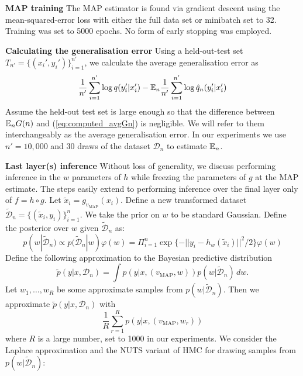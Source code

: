 \documentclass{article} %
\begin{document}

\textbf{MAP training}
The MAP estimator is found via gradient descent using the mean-squared-error loss with either the full data set or minibatch set to 32. Training was set to 5000 epochs. No form of early stopping was employed.

\textbf{Calculating the generalisation error}
Using a held-out-test set $T_{n'} = \{(x_i',y_i')\}_{i=1}^{n'}$, we calculate the average generalisation error as
\begin{equation}
\frac{1}{n'} \sum_{i=1}^{n'} \log q(y_i'|x_i') - {\mathbb{E}}_n \frac{1}{n'} \sum_{i=1}^{n'} \log \hat q_n(y_i'|x_i')
\label{eq:computed_avgGn}
\end{equation}
Assume the held-out test set is large enough so that the difference between ${\mathbb{E}}_n G(n)$ and (\ref{eq:computed_avgGn}) is negligible. We will refer to them interchangeably as the average generalisation error. In our experiments we use $n' = 10,000$ and $30$ draws of the dataset $\mathcal{D}_n$ to estimate ${\mathbb{E}}_n$.

\textbf{Last layer(s) inference}
Without loss of generality, we discuss performing inference in the $w$ parameters of $h$ while freezing the parameters of $g$ at the MAP estimate. The steps easily extend to performing inference over the final layer only of $f = h \circ g$. Let $\tilde x_i = g_{v_{\operatorname{MAP}}}(x_i)$. Define a new transformed dataset $\tilde{\mathcal D}_n = \{(\tilde x_i, y_i) \}_{i=1}^n$. We take the prior on $w$ to be standard Gaussian. 
Define the posterior over $w$ given $\tilde{\mathcal D}_n$ as:
\begin{equation}
p(w | \tilde{\mathcal D}_n) \propto p(\tilde{\mathcal D}_n | w) \varphi(w) = \Pi_{i=1}^n \exp\{-|| y_i - h_w(\tilde x_i) ||^2/2\} \varphi(w)
\label{eq:last_layer_posterior}
\end{equation}
Define the following approximation to the Bayesian predictive distribution
$$
\tilde p(y|x, \mathcal D_n) = \int p(y|x,(v_{\operatorname{MAP}},w)) p(w|\tilde{\mathcal D}_n) \,dw.
$$
Let $w_1,\ldots,w_R$ be some approximate samples from $p(w | \tilde{\mathcal D}_n)$. Then we approximate $\tilde p(y|x, \mathcal D_n)$ with
\[
\frac{1}{R} \sum_{r=1}^R p(y|x,(v_{\operatorname{MAP}},w_r))
\]
where $R$ is a large number, set to 1000 in our experiments. We consider the Laplace approximation and the NUTS variant of HMC for drawing samples from $p(w | \tilde{\mathcal D}_n)$:
\end{document}
